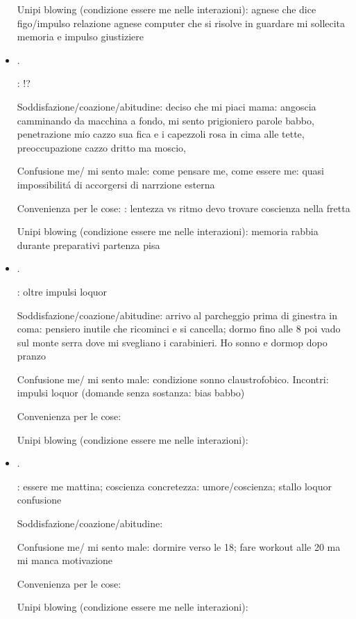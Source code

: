 \begin{itemize}
Unipi blowing (condizione essere me nelle interazioni): agnese che dice figo/impulso relazione agnese computer che si risolve in guardare mi sollecita memoria e impulso giustiziere

\item {}.

: !?

Soddisfazione/coazione/abitudine: deciso che mi piaci mama: angoscia camminando da macchina a fondo, mi sento prigioniero parole babbo, penetrazione mio cazzo sua fica e i capezzoli rosa in cima alle tette, preoccupazione cazzo dritto ma moscio,

Confusione me/ mi sento male: come pensare me, come essere me: quasi impossibilit\'a di accorgersi di narrzione esterna

Convenienza per le cose: : lentezza vs ritmo devo trovare coscienza nella fretta

Unipi blowing (condizione essere me nelle interazioni): memoria rabbia durante preparativi partenza pisa

\item {}.

: oltre impulsi loquor

Soddisfazione/coazione/abitudine: arrivo al parcheggio prima di ginestra in coma: pensiero inutile che ricominci e si cancella; dormo fino alle 8 poi vado sul monte serra dove mi svegliano i carabinieri. Ho sonno e dormop dopo pranzo

Confusione me/ mi sento male: condizione sonno claustrofobico. Incontri: impulsi loquor (domande senza sostanza: bias babbo)

Convenienza per le cose:

Unipi blowing (condizione essere me nelle interazioni):

\item {}.

: essere me mattina; coscienza concretezza: umore/coscienza; stallo loquor confusione

Soddisfazione/coazione/abitudine: 

Confusione me/ mi sento male: dormire verso le 18; fare workout alle 20 ma mi manca motivazione

Convenienza per le cose:

Unipi blowing (condizione essere me nelle interazioni):


\end{itemize}

